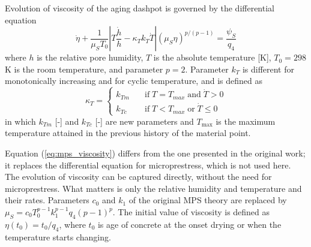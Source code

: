 \documentclass[a4paper]{article}
\begin{document}
Evolution of viscosity of the aging dashpot is governed by the differential
equation 
\begin{equation}
\label{eq:mps_viscosity}
\dot{\eta}+\frac{1}{\mu_S T_0} \left |  T \frac{\dot{h}}{h} - \kappa_T k_T \dot{T}  \right | \left( \mu_S \eta \right)^{p/\left(p-1\right)} = \frac{\psi_S}{q_4}
\end{equation}
where $h$ is the relative pore humidity, $T$ is the absolute temperature [K], $T_0 = 298$ K is the room temperature, and parameter $p = 2$. Parameter $k_T$ is different for monotonically increasing and for cyclic temperature, and is defined as
\begin{equation}
\kappa_T = \left \{ \begin{array}{ll}
k_{Tm} & \quad \mathrm{if} \; T = T_{max} \; \mathrm{and} \; \dot{T} > 0 \\
k_{Tc} & \quad \mathrm{if} \; T < T_{max} \; \mathrm{or} \; \dot{T} \leq 0 
\end{array} \right.
\label{eq:mps_temperature}
\end{equation}
in which  $k_{Tm}$ [-] and $k_{Tc}$ [-] are new parameters and $T_{\max}$ is the
maximum temperature attained in the previous history of the material point. 

Equation (\ref{eq:mps_viscosity}) differs from the one presented in the original work; it replaces the differential equation for microprestress, which is not used here. The evolution of viscosity can be captured directly, without the need for microprestress. What matters is only the relative humidity and temperature and their rates. Parameters $c_0$ and $k_1$ of the original MPS theory
are replaced by $\mu_S = c_0 T_0^{p-1} k_1^{p-1} q_4 (p-1)^p$. 
The initial value of viscosity is defined as $\eta(t_0) = t_0/q_4$, where $t_0$ is age of concrete at the onset drying or when the temperature starts changing.
\end{document}

